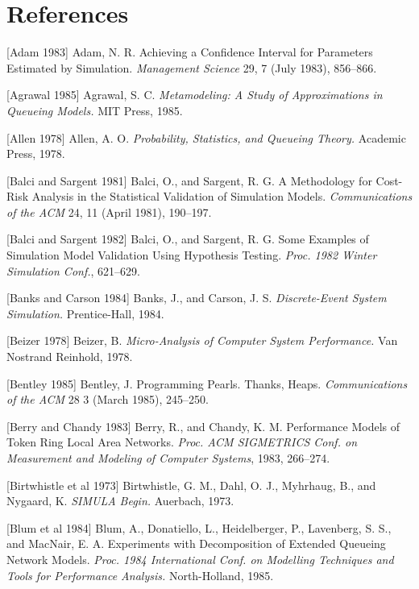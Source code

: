 \chapter{References}
\label{chap:references}

\begingroup
\small
\setlength{\parindent}{0pt}
\setlength{\parskip}{0.5\baselineskip}

[Adam 1983] Adam, N. R. Achieving a Confidence Interval for Parameters Estimated by Simulation. \textit{Management Science} 29, 7 (July 1983), 856--866.

[Agrawal 1985] Agrawal, S. C. \textit{Metamodeling: A Study of Approximations in Queueing Models.} MIT Press, 1985.

[Allen 1978] Allen, A. O. \textit{Probability, Statistics, and Queueing Theory.} Academic Press, 1978.

[Balci and Sargent 1981] Balci, O., and Sargent, R. G. A Methodology for Cost-Risk Analysis in the Statistical Validation of Simulation Models. \textit{Communications of the ACM} 24, 11 (April 1981), 190--197.

[Balci and Sargent 1982] Balci, O., and Sargent, R. G. Some Examples of Simulation Model Validation Using Hypothesis Testing. \textit{Proc. 1982 Winter Simulation Conf.}, 621--629.

[Banks and Carson 1984] Banks, J., and Carson, J. S. \textit{Discrete-Event System Simulation.} Prentice-Hall, 1984.

[Beizer 1978] Beizer, B. \textit{Micro-Analysis of Computer System Performance.} Van Nostrand Reinhold, 1978.

[Bentley 1985] Bentley, J. Programming Pearls. Thanks, Heaps. \textit{Communications of the ACM} 28 3 (March 1985), 245--250.

[Berry and Chandy 1983] Berry, R., and Chandy, K. M. Performance Models of Token Ring Local Area Networks. \textit{Proc. ACM SIGMETRICS Conf. on Measurement and Modeling of Computer Systems}, 1983, 266--274.

[Birtwhistle et al 1973] Birtwhistle, G. M., Dahl, O. J., Myhrhaug, B., and Nygaard, K. \textit{SIMULA Begin.} Auerbach, 1973.

[Blum et al 1984] Blum, A., Donatiello, L., Heidelberger, P., Lavenberg, S. S., and MacNair, E. A. Experiments with Decomposition of Extended Queueing Network Models. \textit{Proc. 1984 International Conf. on Modelling Techniques and Tools for Performance Analysis.} North-Holland, 1985.

